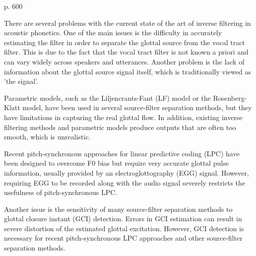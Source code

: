 \citep{Chien2017}
\citep{Alku2011} p. 600

There are several problems with the current state of the art of inverse filtering in acoustic phonetics. One of the main issues is the difficulty in accurately estimating the filter in order to separate the glottal source from the vocal tract filter. This is due to the fact that the vocal tract filter is not known a priori and can vary widely across speakers and utterances. Another problem is the lack of information about the glottal source signal itself, which is traditionally viewed as 'the signal'.

Parametric models, such as the Liljencrants-Fant (LF) model or the Rosenberg-Klatt model, have been used in several source-filter separation methods, but they have limitations in capturing the real glottal flow. In addition, existing inverse filtering methods and parametric models produce outputs that are often too smooth, which is unrealistic.

Recent pitch-synchronous approaches for linear predictive coding (LPC) have been designed to overcome F0 bias but require very accurate glottal pulse information, usually provided by an electroglottography (EGG) signal. However, requiring EGG to be recorded along with the audio signal severely restricts the usefulness of pitch-synchronous LPC.

Another issue is the sensitivity of many source-filter separation methods to glottal closure instant (GCI) detection. Errors in GCI estimation can result in severe distortion of the estimated glottal excitation. However, GCI detection is necessary for recent pitch-synchronous LPC approaches and other source-filter separation methods.
